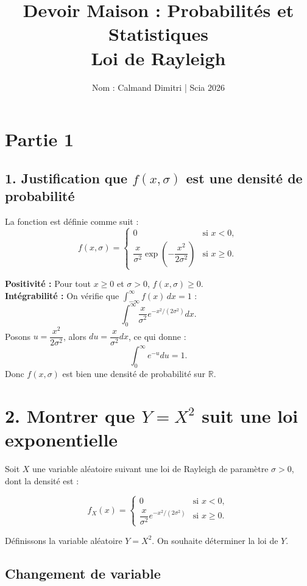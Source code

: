 \documentclass[a4paper,11pt]{article}
\title{Devoir Maison : Probabilités et Statistiques \\ Loi de Rayleigh}
\author{Nom : Calmand Dimitri | Scia 2026}
\date{}
\begin{document}
\maketitle

\section*{Partie 1}

\subsection*{1. Justification que $f(x,\sigma)$ est une densité de probabilité}

La fonction est définie comme suit :
\[
f(x, \sigma) = 
\begin{cases}
0 & \text{si } x < 0, \\
\dfrac{x}{\sigma^2} \exp\left(-\dfrac{x^2}{2\sigma^2}\right) & \text{si } x \ge 0.
\end{cases}
\]

\vspace{0.5em}
\textbf{Positivité :} Pour tout $x \ge 0$ et $\sigma > 0$, $f(x,\sigma) \ge 0$.\\

\textbf{Intégrabilité :} On vérifie que $\int_{-\infty}^{\infty} f(x)\,dx = 1$ :
\[
\int_0^\infty \dfrac{x}{\sigma^2} e^{-x^2/(2\sigma^2)} dx.
\]
Posons $u = \dfrac{x^2}{2\sigma^2}$, alors $du = \dfrac{x}{\sigma^2} dx$, ce qui donne :
\[
\int_0^\infty e^{-u} du = 1.
\]
Donc $f(x,\sigma)$ est bien une densité de probabilité sur $\mathbb{R}$.

\vspace{1em}
\section*{2. Montrer que $Y = X^2$ suit une loi exponentielle}

Soit $X$ une variable aléatoire suivant une loi de Rayleigh de paramètre $\sigma > 0$, dont la densité est :

\[
f_X(x) =
\begin{cases}
0 & \text{si } x < 0, \\
\dfrac{x}{\sigma^2} e^{-x^2 / (2\sigma^2)} & \text{si } x \geq 0.
\end{cases}
\]

Définissons la variable aléatoire $Y = X^2$. On souhaite déterminer la loi de $Y$.

\subsection*{Changement de variable}
\end{document}

